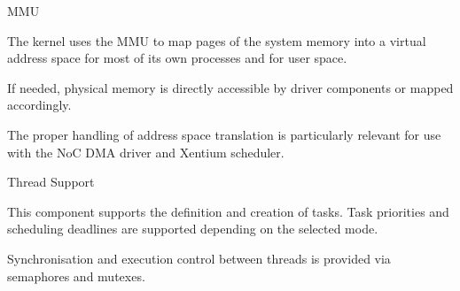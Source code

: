 %
{\gls{MMU}}{%
The kernel uses the \gls{MMU} to map pages of the system memory into a virtual
address space for most of its own processes and for user space.

If needed, physical memory is directly accessible by driver components or
mapped accordingly.

}%
{}{The proper handling of address space translation
is particularly relevant for use with the \gls{NoC} \gls{DMA} driver and
\gls{Xentium} scheduler.}



%
{Thread Support}{%
This component supports the definition and creation of tasks. Task priorities
and scheduling deadlines are supported depending on the selected mode.\newline

Synchronisation and execution control between threads is provided via semaphores
and mutexes.
}%
{}{}


